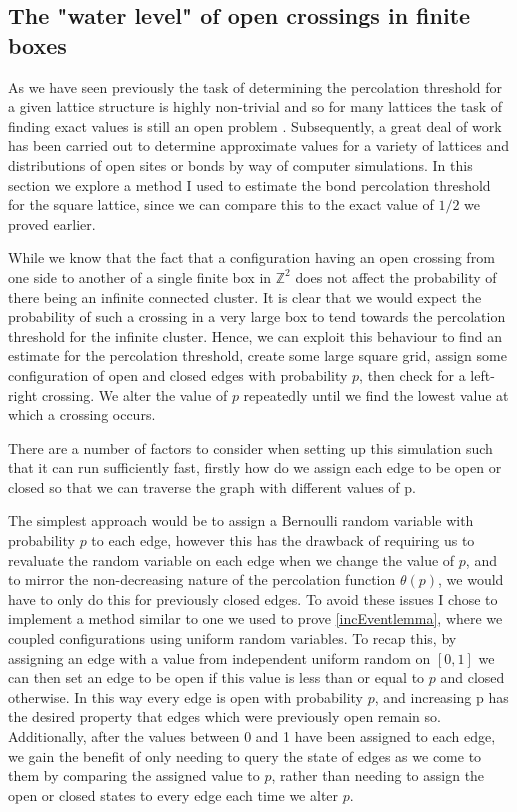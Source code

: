 \documentclass[a4paper,11pt]{article}
\theoremstyle{definition}
\newcommand{\ints}{\mathbb{Z}}
\begin{document}
\subsection{The "water level" of open crossings in finite boxes}
{\color{red}{Discuss how uniform R.V.s can be assigned to edges to simulate percolation. 
Then plot the threshold for open crossings across some size box. 
Then see the sharpening of said plot when the box size increases.}}

As we have seen previously the task of determining the percolation threshold for a given lattice structure is highly non-trivial and so for many lattices the task of finding exact values is still an open problem \cite{StoverThreshold}. Subsequently, a great deal of work has been carried out to determine approximate values for a variety of lattices and distributions of open sites or bonds by way of computer simulations. In this section we explore a method I used to estimate the bond percolation threshold for the square lattice, since we can compare this to the exact value of $1/2$ we proved earlier. 

While we know that the fact that a configuration having an open crossing from one side to another of a single finite box in $\ints^2$ does not affect the probability of there being an infinite connected cluster. It is clear that we would expect the probability of such a crossing in a very large box to tend towards the percolation threshold for the infinite cluster. Hence, we can exploit this behaviour to find an estimate for the percolation threshold, create some large square grid, assign some configuration of open and closed edges with probability $p$, then check for a left-right crossing. We alter the value of $p$ repeatedly until we find the lowest value at which a crossing occurs.

There are a number of factors to consider when setting up this simulation such that it can run sufficiently fast, firstly how do we assign each edge to be open or closed so that we can traverse the graph with different values of p.

The simplest approach would be to assign a Bernoulli random variable with probability $p$ to each edge, however this has the drawback of requiring us to revaluate the random variable on each edge when we change the value of $p$, and to mirror the non-decreasing nature of the percolation function $\theta(p)$, we would have to only do this for previously closed edges. To avoid these issues I chose to implement a method similar to one we used to prove \ref{incEventlemma}, where we coupled configurations using uniform random variables. To recap this, by assigning an edge with a value from independent uniform random on $[0,1]$ we can then set an edge to be open if this value is less than or equal to $p$ and closed otherwise. In this way every edge is open with probability $p$, and increasing p has the desired property that edges which were previously open remain so. Additionally, after the values between 0 and 1 have been assigned to each edge, we gain the benefit of only needing to query the state of edges as we come to them by comparing the assigned value to $p$, rather than needing to assign the open or closed states to every edge each time we alter $p$.
\end{document}
